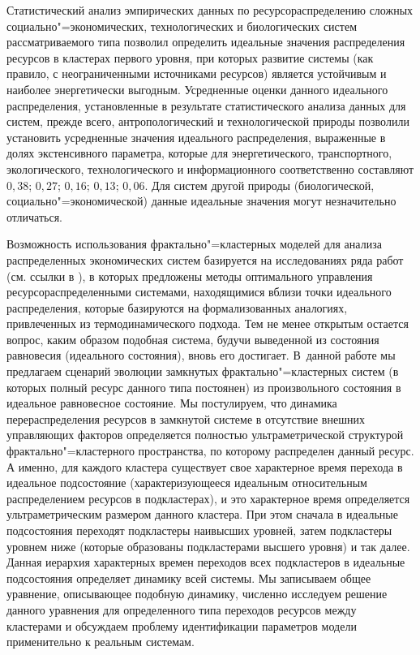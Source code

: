 Статистический анализ эмпирических данных по ресурсораспределению
сложных социально"=экономических, технологических и биологических
систем рассматриваемого типа позволил определить
\cite{zubarev_volov:bib:Volov1,zubarev_volov:bib:Volov2} идеальные
значения распределения ресурсов в кластерах первого уровня, при
которых развитие системы (как правило, с неограниченными
источниками ресурсов) является устойчивым и наиболее энергетически
выгодным. Усредненные оценки данного идеального распределения,
установленные в результате статистического анализа данных для
систем, прежде всего, антропологический и технологической природы
позволили установить усредненные значения идеального
распределения, выраженные в долях экстенсивного параметра, которые
для энергетического, транспортного, экологического,
технологического и информационного соответственно составляют
$0,38$; $0,27$; $0,16$; $0,13$; $0,06$. Для систем другой природы
(биологической, социально"=экономической) данные идеальные
значения могут незначительно отличаться.

Возможность использования фрактально"=кластерных моделей для
анализа распределенных экономических систем базируется на
исследованиях ряда работ (см. ссылки в
\cite{zubarev_volov:bib:Volov1,zubarev_volov:bib:Volov2}), в
которых предложены методы оптимального управления
ресурсораспределенными системами, находящимися вблизи точки
идеального распределения, которые базируются на формализованных
аналогиях, привлеченных из термодинамического подхода. 
Тем не менее открытым остается вопрос, каким образом  подобная система, будучи
выведенной из состояния равновесия (идеального состояния), вновь
его достигает. В~данной работе мы предлагаем сценарий эволюции
замкнутых фрактально"=кластерных систем (в которых полный ресурс
данного типа постоянен) из произвольного состояния в идеальное
равновесное состояние. Мы постулируем, что динамика
перераспределения ресурсов в замкнутой системе в отсутствие
внешних управляющих факторов определяется полностью
ультраметрической структурой фрактально"=кластерного пространства,
по которому распределен данный ресурс. А именно, для каждого
кластера существует свое характерное время перехода в  идеальное
подсостояние (характеризующееся идеальным относительным
распределением ресурсов в подкластерах), и это характерное время
определяется ультраметрическим размером данного кластера. При этом
сначала в идеальные подсостояния переходят подкластеры наивысших
уровней, затем подкластеры уровнем ниже (которые образованы
подкластерами высшего уровня) и так далее. Данная  иерархия
характерных времен переходов всех подкластеров в идеальные
подсостояния определяет динамику всей системы. Мы записываем общее
уравнение, описывающее подобную динамику, численно исследуем
решение данного уравнения для определенного типа переходов
ресурсов между кластерами и обсуждаем проблему идентификации
параметров модели применительно к реальным системам.

